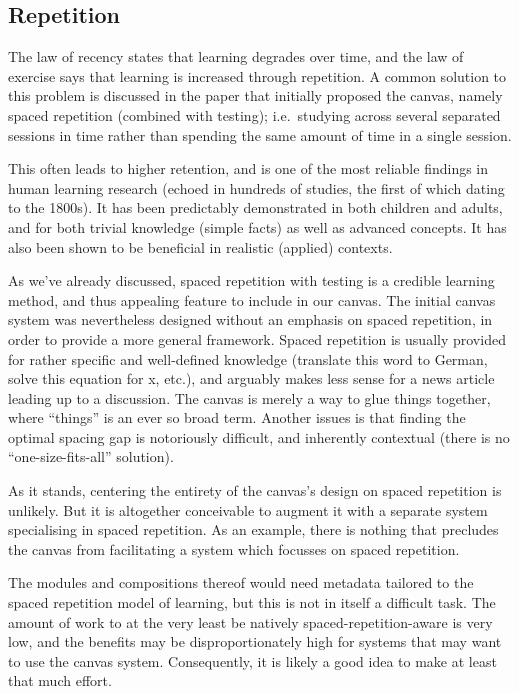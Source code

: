 \documentclass{article}
\begin{document}
\begin{multicols}{2}
 \subsection{Repetition}
\label{repetition}
The law of recency states that learning degrades over time, and the law of 
exercise says that learning is increased through 
repetition\cite{murphy2011games}. A common solution to this problem is 
discussed in the paper that initially proposed the 
canvas\cite{berntsen2015enabling}, namely spaced repetition (combined with 
testing); i.e.\ studying across several separated sessions in time rather than 
spending the same amount of time in a single session.

This often leads to higher retention, and is one of the most reliable findings 
in human learning research (echoed in hundreds of studies, the first of which 
dating to the 1800s). It has been predictably demonstrated in both children 
and adults, and for both trivial knowledge (simple facts) as well as advanced 
concepts\cite{carpenter2012using}. It has also been shown to be beneficial in 
realistic (applied) contexts\cite{sobel2011spacing, carpenter2012using}.

As we've already discussed\cite{berntsen2015enabling}, spaced repetition with 
testing is a credible learning method, and thus appealing feature to include 
in our canvas. The initial canvas system was nevertheless designed without an 
emphasis on spaced repetition, in order to provide a more general framework. 
Spaced repetition is usually provided for rather specific and well-defined 
knowledge (translate this word to German, solve this equation for x, etc.), 
and arguably makes less sense for a news article leading up to a discussion. 
The canvas is merely a way to glue things together, where ``things'' is an 
ever so broad term. Another issues is that finding the optimal spacing gap is 
notoriously difficult, and inherently contextual (there is no 
``one-size-fits-all'' solution)\cite{carpenter2012using}.

As it stands, centering the entirety of the canvas's design on spaced 
repetition is unlikely. But it is altogether conceivable to augment it with a 
separate system specialising in spaced repetition. As an example, there is 
nothing that precludes the canvas from facilitating a system which focusses on 
spaced repetition.

The modules and compositions thereof would need metadata tailored to the 
spaced repetition model of learning, but this is not in itself a difficult 
task. The amount of work to at the very least be natively 
spaced-repetition-aware is very low, and the benefits may be 
disproportionately high for systems that may want to use the canvas system. 
Consequently, it is likely a good idea to make at least that much effort.


\end{multicols}
\end{document}
